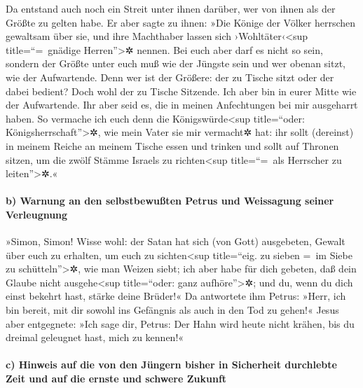  Da entstand auch noch ein Streit unter ihnen darüber,
wer von ihnen als der Größte zu gelten habe.  Er aber
sagte zu ihnen: »Die Könige der Völker herrschen gewaltsam über sie, und
ihre Machthaber lassen sich ›Wohltäter‹\textless sup title=``=~gnädige
Herren''\textgreater✲ nennen.  Bei euch aber darf es
nicht so sein, sondern der Größte unter euch muß wie der Jüngste sein
und wer obenan sitzt, wie der Aufwartende.  Denn wer ist
der Größere: der zu Tische sitzt oder der dabei bedient? Doch wohl der
zu Tische Sitzende. Ich aber bin in eurer Mitte wie der Aufwartende.
 Ihr aber seid es, die in meinen Anfechtungen bei mir
ausgeharrt haben.  So vermache ich euch denn die
Königswürde\textless sup title=``oder: Königsherrschaft''\textgreater✲,
wie mein Vater sie mir vermacht✲ hat:  ihr sollt
(dereinst) in meinem Reiche an meinem Tische essen und trinken und sollt
auf Thronen sitzen, um die zwölf Stämme Israels zu richten\textless sup
title=``=~als Herrscher zu leiten''\textgreater✲.«

\hypertarget{b-warnung-an-den-selbstbewuuxdften-petrus-und-weissagung-seiner-verleugnung}{%
\paragraph{b) Warnung an den selbstbewußten Petrus und Weissagung seiner
Verleugnung}\label{b-warnung-an-den-selbstbewuuxdften-petrus-und-weissagung-seiner-verleugnung}}

 »Simon, Simon! Wisse wohl: der Satan hat sich (von Gott)
ausgebeten, Gewalt über euch zu erhalten, um euch zu
sichten\textless sup title=``eig. zu sieben =~im Siebe zu
schütteln''\textgreater✲, wie man Weizen siebt;  ich aber
habe für dich gebeten, daß dein Glaube nicht ausgehe\textless sup
title=``oder: ganz aufhöre''\textgreater✲; und du, wenn du dich einst
bekehrt hast, stärke deine Brüder!«  Da antwortete ihm
Petrus: »Herr, ich bin bereit, mit dir sowohl ins Gefängnis als auch in
den Tod zu gehen!«  Jesus aber entgegnete: »Ich sage dir,
Petrus: Der Hahn wird heute nicht krähen, bis du dreimal geleugnet hast,
mich zu kennen!«

\hypertarget{c-hinweis-auf-die-von-den-juxfcngern-bisher-in-sicherheit-durchlebte-zeit-und-auf-die-ernste-und-schwere-zukunft}{%
\paragraph{c) Hinweis auf die von den Jüngern bisher in Sicherheit
durchlebte Zeit und auf die ernste und schwere
Zukunft}\label{c-hinweis-auf-die-von-den-juxfcngern-bisher-in-sicherheit-durchlebte-zeit-und-auf-die-ernste-und-schwere-zukunft}}

